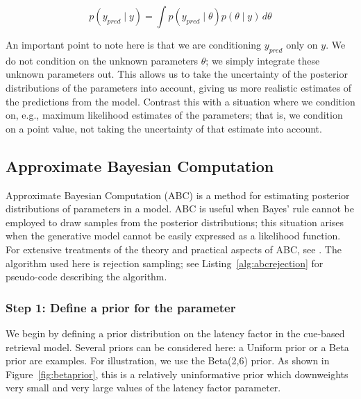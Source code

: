 \documentclass{cambridge7A}\usepackage[]{graphicx}\usepackage[]{color}
\begin{document}
\begin{equation}
p(y_{pred}\mid y) = \int p(y_{pred} \mid \theta) p(\theta \mid y)\, d\theta
\end{equation}

An important point to note here is that we are conditioning $y_{pred}$ only on $y$. We do not condition on the unknown parameters $\theta$; we simply integrate these unknown parameters out. This allows us to take the uncertainty of the posterior distributions of the parameters into account, giving us more realistic estimates of the predictions from the model. Contrast this with a situation where we condition on, e.g.,  maximum likelihood estimates of the parameters; that is,  we condition on a point value, not taking the uncertainty of that estimate into account.

\subsection{Approximate Bayesian Computation}

Approximate Bayesian Computation (ABC) \citep{SissonABC} is a method for estimating posterior distributions of parameters in a model. ABC is useful when Bayes' rule cannot be employed to draw samples from the posterior distributions; this situation arises when the generative model cannot be easily expressed as a likelihood function. For extensive treatments of the theory and practical aspects of ABC, see \cite{SissonABC,palestro2018likelihood}.  The algorithm used here is rejection sampling; see Listing~\ref{alg:abcrejection} for pseudo-code describing the algorithm.


\subsubsection{Step 1: Define a prior for the parameter}

We begin by defining a prior distribution on the latency factor in the cue-based retrieval model. Several priors can be considered here: a Uniform prior or a Beta prior are examples. For illustration, we use the Beta(2,6) prior. As shown in Figure~\ref{fig:betaprior}, this is a relatively uninformative prior which downweights very small and very large values of the latency factor parameter.
\end{document}
